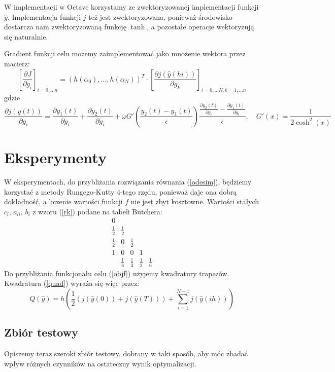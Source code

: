 \documentclass[licencjacka]{pracamgr}
\begin{document}
W implementacji w Octave korzystamy ze zwektoryzowanej implementacji funkcji $\hat{y}$. Implementacja funkcji $j$ też jest zwektoryzowana, ponieważ środowisko dostarcza nam zwektoryzowaną funkcję $\tanh$, a pozostałe operacje wektoryzują się naturalnie.

Gradient funkcji celu możemy zaimplementować jako mnożenie wektora przez macierz:
\begin{equation}
  {\left[\frac{\partial J}{\partial g_i}\right]}_{i = 0, \ldots n} = {\left(h(\alpha_0),\ldots,h(\alpha_N)\right)}^T \cdot {\left[\frac{\partial j(\hat{y}(hi))}{\partial g_k}\right]}_{i = 0, \ldots N, k = 1, \ldots n}
\end{equation}
gdzie
\begin{equation}
  \frac{\partial j(y(t))}{\partial g_i} = \frac{\partial y_1(t)}{\partial g_i} + \frac{\partial y_2(t)}{\partial g_i} + \omega G'\left(\frac{y_2(t) - y_1(t)}{\epsilon}\right)\frac{\frac{\partial y_2(t)}{\partial g_i} - \frac{\partial y_1(t)}{\partial g_i}}{\epsilon},\quad G'(x) = \frac{1}{2\cosh^2(x)}
\end{equation}
\chapter{Eksperymenty}
W eksperymentach, do przybliżania rozwiązania równania (\ref{odesim}), będziemy korzystać z metody Rungego-Kutty 4-tego rzędu, ponieważ daje ona dobrą dokładność, a liczenie wartości funkcji $f$ nie jest zbyt kosztowne. Wartości stałych $c_l$, $a_{li}$, $b_i$ z wzoru (\ref{rk}) podane na tabeli Butchera:
\begin{equation}\label{butcher}
  \begin{array}
    {c|cccc}
    0\\
    \frac{1}{2} & \frac{1}{2}\\
    \frac{1}{2} &0 &\frac{1}{2} \\
    1& 0& 0& 1\\
    \hline{}
    & \frac{1}{6} &\frac{1}{3} &\frac{1}{3} &\frac{1}{6} 
  \end{array}
\end{equation}
Do przybliżania funkcjonału celu (\ref{objf}) użyjemy kwadratury trapezów. Kwadratura (\ref{quad}) wyraża się więc przez:
\begin{equation} \label{trapezoidal}
  Q(\hat{y}) = h\left(\frac{1}{2}(j(\hat{y}(0)) + j(\hat{y}(T))) + \sum_{i=1}^{N-1} j(\hat{y}(ih))\right)
\end{equation}

\section{Zbiór testowy}
Opiszemy teraz szeroki zbiór testowy, dobrany w taki sposób, aby móc zbadać wpływ różnych czynników na ostateczny wynik optymalizacji.
\end{document}
